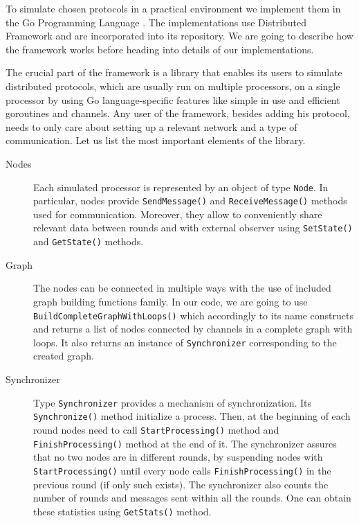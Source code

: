 To simulate chosen protocols in a practical environment we implement them in the Go Programming Language \cite{DK15}. The implementations use Distributed Framework \cite{Tur+22} and are incorporated into its repository. We are going to describe how the framework works before heading into details of our implementations. 

The crucial part of the framework is a library that enables its users to simulate distributed protocols, which are usually run on multiple processors, on a single processor by using Go language-specific features like simple in use and efficient goroutines and channels. Any user of the framework, besides adding his protocol, needs to only care about setting up a relevant network and a type of communication. Let us list the most important elements of the library.

\begin{description}
    \item[Nodes] Each simulated processor is represented by an object of type \texttt{Node}. In particular, nodes provide \texttt{SendMessage()} and \texttt{ReceiveMessage()} methods used for communication. Moreover, they allow to conveniently share relevant data between rounds and with external observer using \texttt{SetState()} and \texttt{GetState()} methods.
    
    \item[Graph] The nodes can be connected in multiple ways with the use of included graph building functions family. In our code, we are going to use \texttt{BuildCompleteGraphWithLoops()} which accordingly to its name constructs and returns a list of nodes connected by channels in a complete graph with loops. It also returns an instance of \texttt{Synchronizer} corresponding to the created graph.

    \item[Synchronizer] Type \texttt{Synchronizer} provides a mechanism of synchronization. Its \texttt{Synchronize()} method initialize a process. Then, at the beginning of each round nodes need to call \texttt{StartProcessing()} method and \texttt{FinishProcessing()} method at the end of it. The synchronizer assures that no two nodes are in different rounds, by suspending nodes with \texttt{StartProcessing()} until every node calls \texttt{FinishProcessing()} in the previous round (if only such exists). The synchronizer also counts the number of rounds and messages sent within all the rounds. One can obtain these statistics using \texttt{GetStats()} method.
\end{description}



